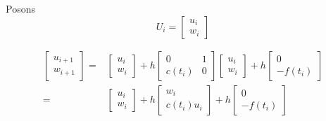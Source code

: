 \documentclass[12pt, letterpaper]{article}
\begin{document}
\begin{enumerate}
\begin{enumerate}
    Posons
    \begin{equation*}
      U_i =
      \left[
        \begin{array}{l}
          u_i \\
          w_i
        \end{array}
        \right]
    \end{equation*}

    \begin{equation*}
      \begin{split}
      \left[
        \begin{array}{l}
          u_{i+1} \\
          w_{i+1}
        \end{array}
        \right]
      =
      &
       \left[
        \begin{array}{l}
          u_i \\
          w_i
        \end{array}
        \right]
      + h
      \left[
        \begin{array}{ll}
          0 & 1 \\
          c(t_i) & 0
        \end{array}
        \right]
      \left[
        \begin{array}{l}
          u_i \\
          w_i
        \end{array}
        \right]
      + h
      \left[
        \begin{array}{l}
          0 \\
          -f(t_i)
        \end{array}
        \right]
      \\
      =
      &
      \left[
        \begin{array}{l}
          u_i \\
          w_i
        \end{array}
        \right]
      + h
      \left[
        \begin{array}{l}
          w_i \\
          c(t_i) u_i
        \end{array}
        \right]
      + h
      \left[
        \begin{array}{l}
          0 \\
          -f(t_i)
        \end{array}
        \right]
      \end{split}
    \end{equation*}


\end{enumerate}
\end{enumerate}
\end{document}
